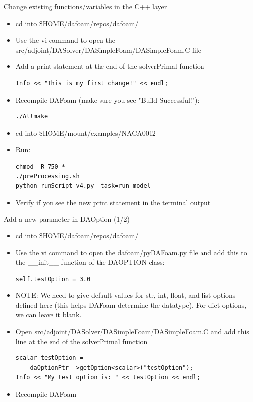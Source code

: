 \documentclass{bredelebeamer}
\begin{document}
\begin{frame}[fragile]{Change existing functions/variables in the C++ layer}

\begin{itemize}
  \item cd into \$HOME/dafoam/repos/dafoam/
  \item Use the vi command to open the src/adjoint/DASolver/DASimpleFoam/DASimpleFoam.C file
  \item Add a print statement at the end of the solverPrimal function
 \begin{lstlisting}
Info << "This is my first change!" << endl;
 \end{lstlisting}
  \item Recompile DAFoam (make sure you see "Build Successful!"):
 \begin{lstlisting}
./Allmake
 \end{lstlisting}
  \item cd into \$HOME/mount/examples/NACA0012
  \item Run:
\begin{lstlisting}
chmod -R 750 *
./preProcessing.sh
python runScript_v4.py -task=run_model
\end{lstlisting}
 \item Verify if you see the new print statement in the terminal output
    
\end{itemize}

\end{frame}


\begin{frame}[fragile]{Add a new parameter in DAOption (1/2)}

\begin{itemize}
  \item cd into \$HOME/dafoam/repos/dafoam/
  \item Use the vi command to open the dafoam/pyDAFoam.py file and add this to the \_\_init\_\_ function of the DAOPTION class:
 \begin{lstlisting}
self.testOption = 3.0
 \end{lstlisting}
 \item NOTE: We need to give default values for str, int, float, and list options defined here (this helps DAFoam determine the datatype). For dict options, we can leave it blank.
 \item Open src/adjoint/DASolver/DASimpleFoam/DASimpleFoam.C and add this line at the end of the solverPrimal function
 \begin{lstlisting}
scalar testOption = 
    daOptionPtr_->getOption<scalar>("testOption");
Info << "My test option is: " << testOption << endl;
 \end{lstlisting}
 \item Recompile DAFoam

\end{itemize}

\end{frame}
\end{document}
